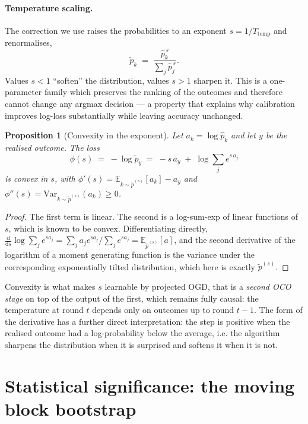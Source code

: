 \documentclass[12pt,a4paper,oneside]{report}
\renewcommand{\_}{\oldunderscore\allowbreak}
\theoremstyle{definition}
\theoremstyle{plain}
\newtheorem{proposition}[theorem]{Proposition}
\theoremstyle{remark}
\begin{document}
\paragraph{Temperature scaling.} The correction we use raises the probabilities to an exponent
$s = 1/T_{\text{temp}}$ and renormalises,
\[
\tilde{p}_k \;=\; \frac{\hat{p}_k^{\,s}}{\sum_{j} \hat{p}_j^{\,s}}.
\]
Values $s<1$ ``soften'' the distribution, values $s>1$ sharpen it. This is a one-parameter
family which preserves the ranking of the outcomes and therefore cannot change any argmax
decision --- a property that explains why calibration improves log-loss substantially while
leaving accuracy unchanged.

\begin{proposition}[Convexity in the exponent]
\label{prop:temp-convex}
Let $a_k = \log \hat{p}_k$ and let $y$ be the realised outcome. The loss
\[
\phi(s) \;=\; -\log \tilde{p}_y \;=\; -s\,a_y \;+\; \log \sum_j e^{s\,a_j}
\]
is convex in $s$, with $\phi'(s) = \mathbb{E}_{k\sim \tilde{p}^{(s)}}[a_k] - a_y$ and
$\phi''(s) = \mathrm{Var}_{k\sim \tilde{p}^{(s)}}(a_k) \geq 0$.
\end{proposition}

\begin{proof}
The first term is linear. The second is a log-sum-exp of linear functions of $s$, which is
known to be convex. Differentiating directly,
$\frac{\mathrm{d}}{\mathrm{d}s}\log\sum_j e^{sa_j}
= \sum_j a_j e^{sa_j}/\sum_j e^{sa_j} = \mathbb{E}_{\tilde{p}^{(s)}}[a]$, and the second
derivative of the logarithm of a moment generating function is the variance under the
corresponding exponentially tilted distribution, which here is exactly $\tilde{p}^{(s)}$.
\end{proof}

Convexity is what makes $s$ learnable by projected OGD, that is a \emph{second OCO stage} on top
of the output of the first, which remains fully causal: the temperature at round $t$ depends only
on outcomes up to round $t-1$. The form of the derivative has a further direct interpretation:
the step is positive when the realised outcome had a log-probability below the average, i.e. the
algorithm sharpens the distribution when it is surprised and softens it when it is not.

\section{Statistical significance: the moving block bootstrap}
\label{sec:bootstrap-theory}
\end{document}
